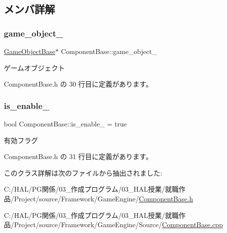 \subsection{メンバ詳解}
\mbox{\label{class_component_base_a60a43b42437cd5be2b05d2f4f4dd8147}} 
\subsubsection{\texorpdfstring{game\+\_\+object\+\_\+}{game\_object\_}}
{\footnotesize\ttfamily \mbox{\hyperlink{class_game_object_base}{Game\+Object\+Base}}$\ast$ Component\+Base\+::game\+\_\+object\+\_\+\hspace{0.3cm}{\ttfamily [private]}}



ゲームオブジェクト 



 Component\+Base.\+h の 30 行目に定義があります。

\mbox{\label{class_component_base_a699404ac57307462ca82a28312fcc439}} 
\subsubsection{\texorpdfstring{is\+\_\+enable\+\_\+}{is\_enable\_}}
{\footnotesize\ttfamily bool Component\+Base\+::is\+\_\+enable\+\_\+ = true\hspace{0.3cm}{\ttfamily [private]}}



有効フラグ 



 Component\+Base.\+h の 31 行目に定義があります。



このクラス詳解は次のファイルから抽出されました\+:\begin{DoxyCompactItemize}
\item 
C\+:/\+H\+A\+L/\+P\+G関係/03\+\_\+作成プログラム/03\+\_\+\+H\+A\+L授業/就職作品/\+Project/source/\+Framework/\+Game\+Engine/\mbox{\hyperlink{_component_base_8h}{Component\+Base.\+h}}\item 
C\+:/\+H\+A\+L/\+P\+G関係/03\+\_\+作成プログラム/03\+\_\+\+H\+A\+L授業/就職作品/\+Project/source/\+Framework/\+Game\+Engine/\+Source/\mbox{\hyperlink{_component_base_8cpp}{Component\+Base.\+cpp}}\end{DoxyCompactItemize}
